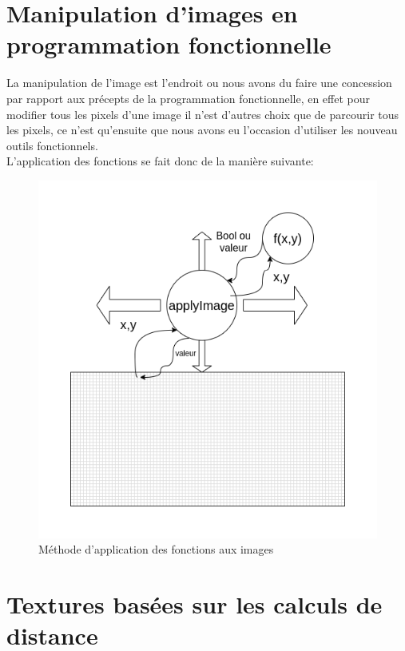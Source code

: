 \documentclass[a4paper,10pt]{article}
\begin{document}
\section{Manipulation d'images en programmation fonctionnelle}
La manipulation de l'image est l'endroit ou nous avons du faire une concession par rapport aux précepts de la programmation fonctionnelle, en effet pour modifier tous les pixels d'une image il n'est d'autres choix que de parcourir tous les pixels, ce n'est qu'ensuite que nous avons eu l'occasion d'utiliser les nouveau outils fonctionnels.
\\
L'application des fonctions se fait donc de la manière suivante:
\begin{figure}[h]
    \centering
    \includegraphics[scale=0.4]{f_forward.png}
    \caption{Méthode d'application des fonctions aux images}
\end{figure}

\newpage

\section{Textures basées sur les calculs de distance}
\end{document}
